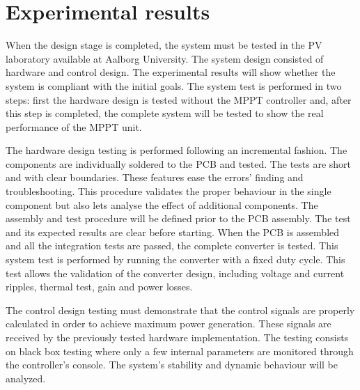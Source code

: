 
\chapter{Experimental results} \label{ch:test_validation}

When the design stage is completed, the system must be tested in the PV laboratory available at Aalborg University. The system design consisted of hardware and control design. The experimental results will show whether the system is compliant with the initial goals. The system test is performed in two steps: first the hardware design is tested without the MPPT controller and, after this step is completed, the complete system will be tested to show the real performance of the MPPT unit.

The hardware design testing is performed following an incremental fashion. The components are individually soldered to the PCB and tested. The tests are short and with clear boundaries. These features ease the errors' finding and troubleshooting. This procedure validates the proper behaviour in the single component but also lets analyse the effect of additional components. The assembly and test procedure will be defined prior to the PCB assembly. The test and its expected results are clear before starting. When the PCB is assembled and all the integration tests are passed, the complete converter is tested. This system test is performed by running the converter with a fixed duty cycle. This test allows the validation of the converter design, including voltage and current ripples, thermal test, gain and power losses.

The control design testing must demonstrate that the control signals are properly calculated in order to achieve maximum power generation. These signals are received by the previously tested hardware implementation. The testing consists on black box testing where only a few internal parameters are monitored through the controller's console. The 
system's stability and dynamic behaviour will be analyzed.



